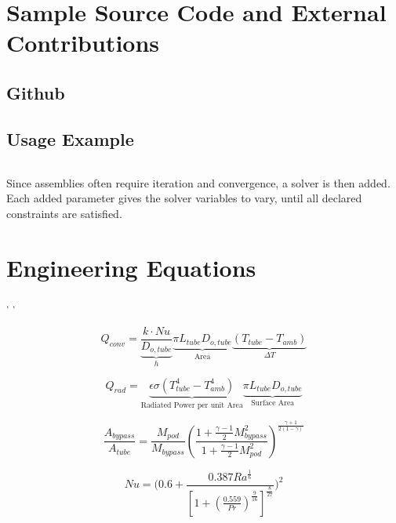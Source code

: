 \documentclass[heading.tex]{subfiles}
\begin{document}
\newpage
\appendix

\section{Sample Source Code and External Contributions} \label{app:Github}

\subsection{Github}


\subsection{Usage Example}



\inputminted[fontsize=\tiny]{python}{code/example1.py}


 Since assemblies often require iteration and convergence, a solver is then added. Each added parameter gives the solver variables to vary, until all declared constraints are satisfied.

\section{Engineering Equations}

\cite{Cengal}\textsuperscript{,}
\cite{Turns}\textsuperscript{,}
\cite{Churchill}

\begin{equation}
Q_{conv} = \underbrace{ \frac{k\cdot Nu}{ {D}_{o,tube}} }_\text{$h$}
 \underbrace{ \pi {L}_{tube} {D}_{o,tube} }_\text{Area}
 \underbrace{ (T_{tube}-T_{amb})  }_\text{$\Delta T$}
\end{equation}

\begin{equation}
Q_{rad} = \underbrace{\epsilon \sigma (T_{tube}^4 - T_{amb}^4)}_\text{Radiated Power per unit Area}\underbrace{\pi L_{tube} D_{o,tube}}_\text{Surface Area}
\end{equation}

\begin{equation}
\frac{A_{bypass}}{A_{tube}} = \frac{M_{pod}}{M_{bypass}}
\left(\frac{1+ \frac{\gamma-1}{2} M_{bypass}^2}
{1+ \frac{\gamma-1}{2} M_{pod}^2}\right)^{\frac{\gamma+1}{2\left(1-\gamma\right)}}
\label{e:a-over-astar}
\end{equation}

\begin{equation}
Nu = \Bigg(0.6 + \frac{0.387Ra^{\frac{1}{6}}}{[1+(\frac{0.559}{Pr})^{\frac{9}{16}}]^{\frac{8}{27}}}\Bigg)^2
\end{equation}
\end{document}
